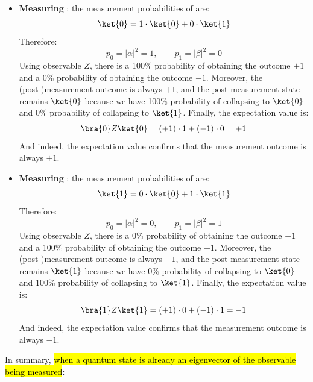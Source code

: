 \begin{itemize}
    \item \textbf{Measuring }: the measurement probabilities of  are:
    \begin{equation*}
        \ket{0} = 1 \cdot \ket{0} + 0 \cdot \ket{1}
    \end{equation*}
    Therefore:
    \begin{equation*}
        p_0 = \left|\alpha\right|^2 = 1,
        \qquad
        p_1 = \left|\beta\right|^2 = 0
    \end{equation*}
    Using observable $Z$, there is a 100\% probability of obtaining the outcome $+1$ and a 0\% probability of obtaining the outcome $-1$. Moreover, the (post-)measurement outcome is always $+1$, and the post-measurement state remains $\ket{0}$ because we have 100\% probability of collapsing to $\ket{0}$ and 0\% probability of collapsing to $\ket{1}$. Finally, the expectation value is:
    \begin{equation*}
        \bra{0} Z \ket{0} = \left(+1\right) \cdot 1 + \left(-1\right) \cdot 0 = +1
    \end{equation*}
    And indeed, the expectation value confirms that the measurement outcome is always $+1$.
    
    \item \textbf{Measuring }: the measurement probabilities of  are:
    \begin{equation*}
        \ket{1} = 0 \cdot \ket{0} + 1 \cdot \ket{1}
    \end{equation*}
    Therefore:
    \begin{equation*}
        p_0 = \left|\alpha\right|^2 = 0,
        \qquad
        p_1 = \left|\beta\right|^2 = 1
    \end{equation*}
    Using observable $Z$, there is a 0\% probability of obtaining the outcome $+1$ and a 100\% probability of obtaining the outcome $-1$. Moreover, the (post-)measurement outcome is always $-1$, and the post-measurement state remains $\ket{1}$ because we have 0\% probability of collapsing to $\ket{0}$ and 100\% probability of collapsing to $\ket{1}$. Finally, the expectation value is:
    \begin{equation*}
        \bra{1} Z \ket{1} = \left(+1\right) \cdot 0 + \left(-1\right) \cdot 1 = -1
    \end{equation*}
    And indeed, the expectation value confirms that the measurement outcome is always $-1$.
\end{itemize}
In summary, \hl{when a quantum state is already an eigenvector of the observable being measured}:

